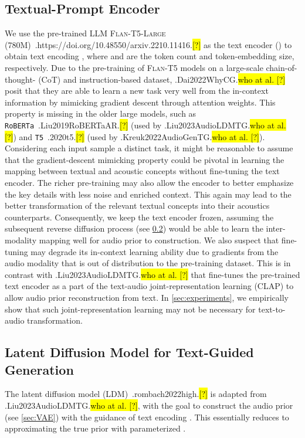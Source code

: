 \documentclass{article}
\let\realcite\cite
\renewcommand{\cite}[1]{\ifx.#1.\hl{[?]}\else\realcite{#1}\fi}
\let\realcitet\citet
\renewcommand{\citet}[1]{\ifx.#1.\hl{who at al. [?]}\else\realcitet{#1}\fi}
\begin{document}
\subsection{Textual-Prompt Encoder}
\label{sec:TE}

We use the pre-trained LLM \textsc{Flan-T5-Large} (780M)~\cite{https://doi.org/10.48550/arxiv.2210.11416} as the text encoder () to obtain text encoding , where  and  are the token count and token-embedding size, respectively. Due to the pre-training of \textsc{Flan-T5} models on a large-scale chain-of-thought- (CoT) and instruction-based dataset, \citet{Dai2022WhyCG} posit that they are able to learn a new task very well from the in-context information by mimicking gradient descent through attention weights. This property is missing in the older large models, such as \texttt{RoBERTa}~\cite{Liu2019RoBERTaAR} (used by \citet{Liu2023AudioLDMTG}) and \texttt{T5}~\cite{2020t5} (used by \citet{Kreuk2022AudioGenTG}). Considering each input sample a distinct task, it might be reasonable to assume that the gradient-descent mimicking property could be pivotal in learning the mapping between textual and acoustic concepts without fine-tuning the text encoder. The richer pre-training may also allow the encoder to better emphasize the key details with less noise and enriched context. This again may lead to the better transformation of the relevant textual concepts into their acoustics counterparts. Consequently, we keep the text encoder frozen, assuming the subsequent reverse diffusion process (see \cref{sec:LDM}) would be able to learn the inter-modality mapping well for audio prior to construction. We also suspect that fine-tuning  may degrade its in-context learning ability due to gradients from the audio modality that is out of distribution to the pre-training dataset. This is in contrast with \citet{Liu2023AudioLDMTG} that fine-tunes the pre-trained text encoder as a part of the text-audio joint-representation learning (CLAP) to allow audio prior reconstruction from text. In \cref{sec:experiments}, we empirically show that such joint-representation learning may not be necessary for text-to-audio transformation.


\subsection{Latent Diffusion Model for Text-Guided Generation}
\label{sec:LDM}

The latent diffusion model (LDM)~\cite{rombach2022high} is adapted from \citet{Liu2023AudioLDMTG}, with the goal to construct the audio prior  (see \cref{sec:VAE}) with the guidance of text encoding . This essentially reduces to approximating the true prior  with parameterized .
\end{document}
